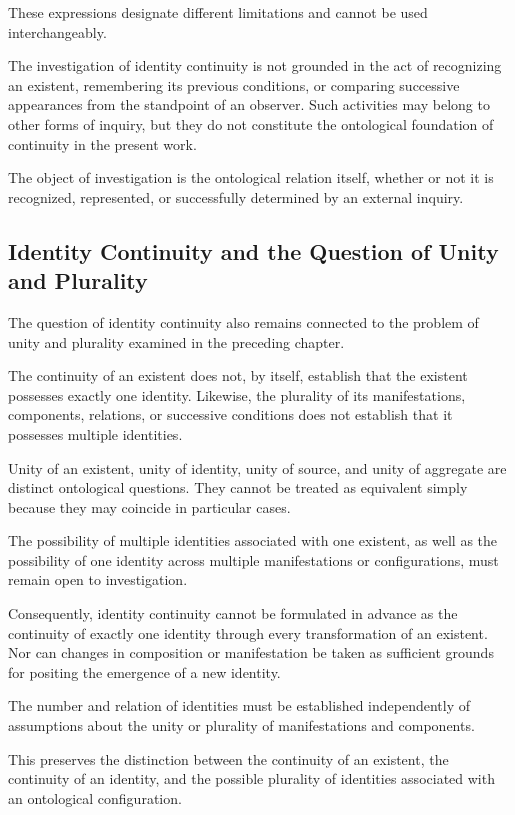 These expressions designate different limitations and cannot be used
interchangeably.

The investigation of identity continuity is not grounded in the act of
recognizing an existent, remembering its previous conditions, or comparing
successive appearances from the standpoint of an observer. Such activities
may belong to other forms of inquiry, but they do not constitute the
ontological foundation of continuity in the present work.

The object of investigation is the ontological relation itself, whether
or not it is recognized, represented, or successfully determined by an
external inquiry.

\subsection{Identity Continuity and the Question of Unity and Plurality}

The question of identity continuity also remains connected to the problem
of unity and plurality examined in the preceding chapter.

The continuity of an existent does not, by itself, establish that the
existent possesses exactly one identity. Likewise, the plurality of its
manifestations, components, relations, or successive conditions does not
establish that it possesses multiple identities.

Unity of an existent, unity of identity, unity of source, and unity of
aggregate are distinct ontological questions. They cannot be treated as
equivalent simply because they may coincide in particular cases.

The possibility of multiple identities associated with one existent, as
well as the possibility of one identity across multiple manifestations
or configurations, must remain open to investigation.

Consequently, identity continuity cannot be formulated in advance as the
continuity of exactly one identity through every transformation of an
existent. Nor can changes in composition or manifestation be taken as
sufficient grounds for positing the emergence of a new identity.

The number and relation of identities must be established independently
of assumptions about the unity or plurality of manifestations and
components.

This preserves the distinction between the continuity of an existent,
the continuity of an identity, and the possible plurality of identities
associated with an ontological configuration.

